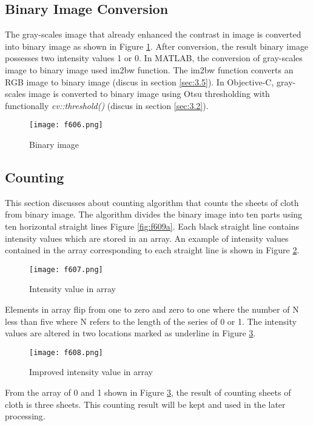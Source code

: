 \subsection{Binary Image Conversion}
The gray-scales image that already enhanced the contrast in image is converted into binary image as shown in Figure \ref{fig:f606}. After conversion, the result binary image possesses two intensity values 1 or 0. In MATLAB, the conversion of gray-scales image to binary image used im2bw function. The im2bw function converts an RGB image to binary image (discus in section \ref{sec:3.5}). In Objective-C, gray-scales image is converted to binary image using Otsu thresholding with functionally \textit{cv::threshold()}  (discus in section \ref{sec:3.2}).
\begin{figure}[t]
	\centering
	\texttt{[image: f606.png]}
	\caption{Binary image}
	\label{fig:f606}
\end{figure}

\subsection{Counting}
This section discusses about counting algorithm that counts the sheets of cloth from binary image. The algorithm divides the binary image into ten parts using ten horizontal straight lines Figure \ref{fig:f609a}. Each black straight line contains intensity values which are stored in an array. An example of intensity values contained in the array corresponding to each straight line is shown in Figure \ref{fig:f607}.
\begin{figure}[t]
	\centering
	\texttt{[image: f607.png]}
	\caption{Intensity value in array}
	\label{fig:f607}
\end{figure}

Elements in array flip from one to zero and zero to one where the number of N less than five where N refers to the length of the series of 0 or 1. The intensity values are altered in two locations marked as underline in Figure \ref{fig:f608}.
\begin{figure}[t]
	\centering
	\texttt{[image: f608.png]}
	\caption{Improved intensity value in array}
	\label{fig:f608}
\end{figure}
From the array of 0 and 1 shown in Figure \ref{fig:f608}, the result of counting sheets of cloth is three sheets. This counting result will be kept and used in the later processing.


